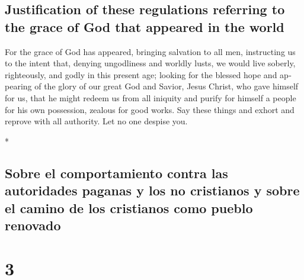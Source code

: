 \begin{paracol}{2}
\begin{otherlanguage}{english}
\hypertarget{justification-of-these-regulations-referring-to-the-grace-of-god-that-appeared-in-the-world}{%
\subsection{Justification of these regulations referring to the grace of
God that appeared in the
world}\label{justification-of-these-regulations-referring-to-the-grace-of-god-that-appeared-in-the-world}}

 For the grace of God has appeared, bringing salvation to
all men,  instructing us to the intent that, denying
ungodliness and worldly lusts, we would live soberly, righteously, and
godly in this present age;  looking for the blessed hope
and appearing of the glory of our great God and Savior, Jesus Christ,
 who gave himself for us, that he might redeem us from
all iniquity and purify for himself a people for his own possession,
zealous for good works.  Say these things and exhort and
reprove with all authority. Let no one despise you.

\end{otherlanguage}

\switchcolumn[0]*

\hypertarget{sobre-el-comportamiento-contra-las-autoridades-paganas-y-los-no-cristianos-y-sobre-el-camino-de-los-cristianos-como-pueblo-renovado}{%
\subsection{Sobre el comportamiento contra las autoridades paganas y los
no cristianos y sobre el camino de los cristianos como pueblo
renovado}\label{sobre-el-comportamiento-contra-las-autoridades-paganas-y-los-no-cristianos-y-sobre-el-camino-de-los-cristianos-como-pueblo-renovado}}

\hypertarget{section-4}{%
\section{3}\label{section-4}}


\end{paracol}
